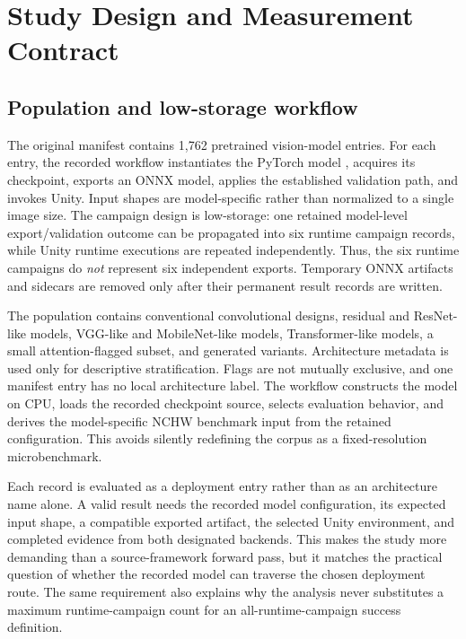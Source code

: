 \section{Study Design and Measurement Contract}
\label{sec:design}

\StudyBoundaryFigure

\subsection{Population and low-storage workflow}
The original manifest contains 1,762 pretrained vision-model entries. For each entry, the recorded workflow instantiates the PyTorch model \citep{pytorch2019}, acquires its checkpoint, exports an ONNX model, applies the established validation path, and invokes Unity. Input shapes are model-specific rather than normalized to a single image size. The campaign design is low-storage: one retained model-level export/validation outcome can be propagated into six runtime campaign records, while Unity runtime executions are repeated independently. Thus, the six runtime campaigns do \emph{not} represent six independent exports. Temporary ONNX artifacts and sidecars are removed only after their permanent result records are written.

The population contains conventional convolutional designs, residual and ResNet-like models, VGG-like and MobileNet-like models, Transformer-like models, a small attention-flagged subset, and generated variants. Architecture metadata is used only for descriptive stratification. Flags are not mutually exclusive, and one manifest entry has no local architecture label. The workflow constructs the model on CPU, loads the recorded checkpoint source, selects evaluation behavior, and derives the model-specific NCHW benchmark input from the retained configuration. This avoids silently redefining the corpus as a fixed-resolution microbenchmark.

Each record is evaluated as a deployment entry rather than as an architecture name alone. A valid result needs the recorded model configuration, its expected input shape, a compatible exported artifact, the selected Unity environment, and completed evidence from both designated backends. This makes the study more demanding than a source-framework forward pass, but it matches the practical question of whether the recorded model can traverse the chosen deployment route. The same requirement also explains why the analysis never substitutes a maximum runtime-campaign count for an all-runtime-campaign success definition.

